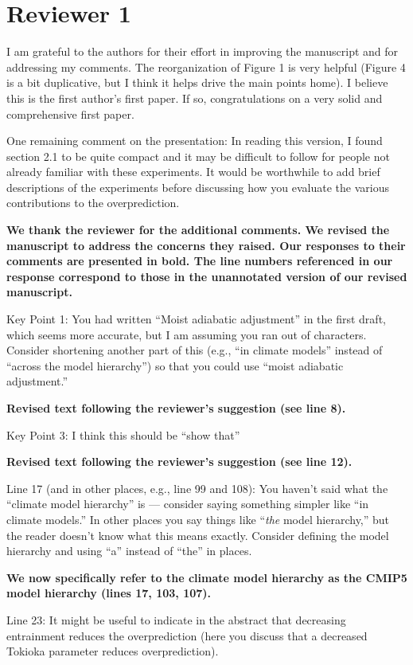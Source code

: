 \documentclass[11pt]{article}
\date{}
\title{}
\begin{document}
\section*{Reviewer 1}
\label{sec:orgaf4c508}
I am grateful to the authors for their effort in improving the manuscript and for addressing my comments. The reorganization of Figure 1 is very helpful (Figure 4 is a bit duplicative, but I think it helps drive the main points home). I believe this is the first author's first paper. If so, congratulations on a very solid and comprehensive first paper.

One remaining comment on the presentation: In reading this version, I found section 2.1 to be quite compact and it may be difficult to follow for people not already familiar with these experiments. It would be worthwhile to add brief descriptions of the experiments before discussing how you evaluate the various contributions to the overprediction.

\textbf{We thank the reviewer for the additional comments. We revised the manuscript to address the concerns they raised. Our responses to their comments are presented in bold. The line numbers referenced in our response correspond to those in the unannotated version of our revised manuscript.}

Key Point 1: You had written ``Moist adiabatic adjustment'' in the first draft, which seems more accurate, but I am assuming you ran out of characters. Consider shortening another part of this (e.g., ``in climate models'' instead of ``across the model hierarchy'') so that you could use ``moist adiabatic adjustment.''

\textbf{Revised text following the reviewer's suggestion (see line 8).}

Key Point 3: I think this should be ``show that''

\textbf{Revised text following the reviewer's suggestion (see line 12).}

Line 17 (and in other places, e.g., line 99 and 108): You haven't said what the ``climate model hierarchy'' is --- consider saying something simpler like ``in climate models.'' In other places you say things like ``\emph{the} model hierarchy,'' but the reader doesn't know what this means exactly. Consider defining the model hierarchy and using ``a'' instead of ``the'' in places.

\textbf{We now specifically refer to the climate model hierarchy as the CMIP5 model hierarchy (lines 17, 103, 107).}

Line 23: It might be useful to indicate in the abstract that decreasing entrainment reduces the overprediction (here you discuss that a decreased Tokioka parameter reduces overprediction).
\end{document}
